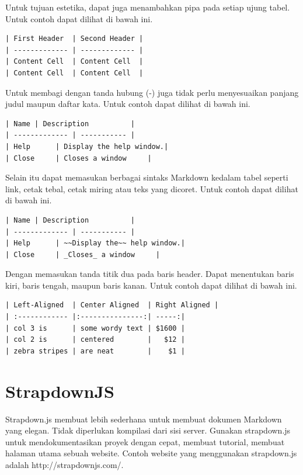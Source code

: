 \begin{enumerate}
Untuk tujuan estetika, dapat juga menambahkan pipa pada setiap ujung tabel. Untuk contoh dapat dilihat di bawah ini.
\begin{lstlisting}
| First Header  | Second Header |
| ------------- | ------------- |
| Content Cell  | Content Cell  |
| Content Cell  | Content Cell  |
\end{lstlisting}

Untuk membagi dengan tanda hubung (-) juga tidak perlu menyesuaikan panjang judul maupun daftar kata. Untuk contoh dapat dilihat di bawah ini.
\begin{lstlisting}
| Name | Description          |
| ------------- | ----------- |
| Help      | Display the help window.|
| Close     | Closes a window     |
\end{lstlisting}

Selain itu dapat memasukan berbagai sintaks Markdown kedalam tabel seperti link, cetak tebal, cetak miring atau teks yang dicoret. Untuk contoh dapat dilihat di bawah ini.
\begin{lstlisting}
| Name | Description          |
| ------------- | ----------- |
| Help      | ~~Display the~~ help window.|
| Close     | _Closes_ a window     |
\end{lstlisting}

Dengan memasukan tanda titik dua pada baris header. Dapat menentukan baris kiri, baris tengah, maupun baris kanan. Untuk contoh dapat dilihat di bawah ini.
\begin{lstlisting}
| Left-Aligned  | Center Aligned  | Right Aligned |
| :------------ |:---------------:| -----:|
| col 3 is      | some wordy text | $1600 |
| col 2 is      | centered        |   $12 |
| zebra stripes | are neat        |    $1 |
\end{lstlisting}

\section{StrapdownJS \cite{Strapdownjs:2014}}
\label{sec:stapdownjs}

Strapdown.js membuat lebih sederhana untuk membuat dokumen Markdown yang elegan. Tidak diperlukan kompilasi dari sisi server. Gunakan strapdown.js untuk mendokumentasikan proyek dengan cepat, membuat tutorial, membuat halaman utama sebuah website. Contoh website yang menggunakan strapdown.js adalah http://strapdownjs.com/.


\end{enumerate}
